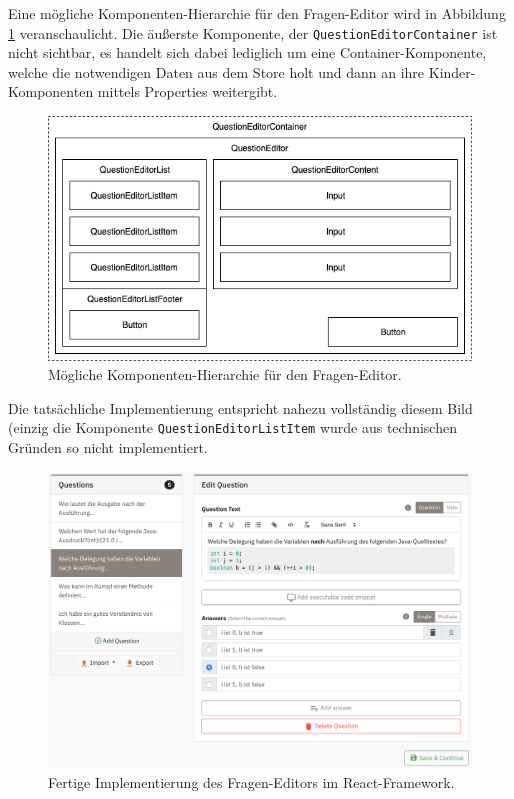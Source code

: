 Eine mögliche Komponenten-Hierarchie für den Fragen-Editor wird in Abbildung \ref{abb:komponenten_hierarchie} veranschaulicht. Die äußerste Komponente, der \texttt{QuestionEditorContainer} ist nicht sichtbar, es handelt sich dabei lediglich um eine Container-Komponente, welche die notwendigen Daten aus dem Store holt und dann an ihre Kinder-Komponenten mittels Properties weitergibt.

\begin{figure}[H]
    \includegraphics[width=\textwidth]{chapter/entwurf/bilder/Component_Hierarchy.png}
    \centering
    \caption{Mögliche Komponenten-Hierarchie für den Fragen-Editor.}
    \label{abb:komponenten_hierarchie}
\end{figure}

Die tatsächliche Implementierung entspricht nahezu vollständig diesem Bild (einzig die Komponente \texttt{QuestionEditorListItem} wurde aus technischen Gründen so nicht implementiert.

\begin{figure}[H]
    \includegraphics[width=\textwidth]{chapter/entwurf/bilder/weclare_editor.png}
    \centering
    \caption{Fertige Implementierung des Fragen-Editors im React-Framework.}
    \label{abb:weclare_editor}
\end{figure}

